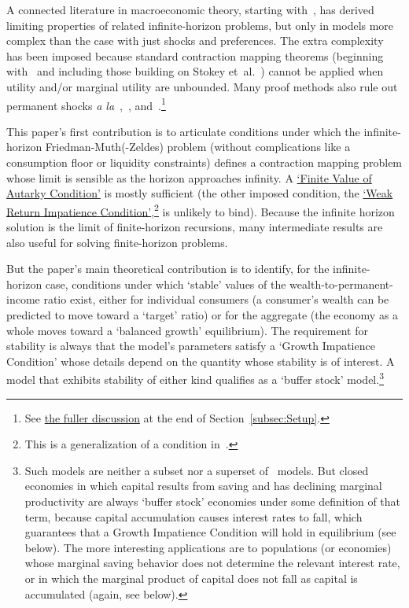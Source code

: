 \documentclass[BufferStockTheory]{subfiles}
\begin{document}
A connected literature in macroeconomic theory, starting with~\cite{bewleyPIH}, has derived limiting properties of related infinite-horizon problems, but only in models more complex than the case with just shocks and preferences. The extra complexity has been imposed because standard contraction mapping theorems (beginning with~\cite{bellmanDynamicProgramming} and including those building on Stokey et~al.~\citeyearpar{slpMethods}) cannot be applied when utility and/or marginal utility are unbounded. Many proof methods also rule out permanent shocks \textit{a la}~\cite{friedmanATheory},~\cite{muthOptimal}, and~\cite{zeldesStochastic}.\footnote{See \hyperlink{DiffFromLit}{the fuller discussion} at the end of Section~\ref{subsec:Setup}.}

This paper's first contribution is to articulate conditions under which the infinite-horizon Friedman-Muth(-Zeldes) problem (without complications like a consumption floor or liquidity constraints) defines a contraction mapping problem whose limit is sensible as the horizon approaches infinity.  A \hyperlink{FVAC}{`Finite Value of Autarky Condition'} is mostly sufficient (the other imposed condition, the \hyperlink{WRIC}{`Weak Return Impatience Condition'},\footnote{This is a generalization of a condition in~\cite{mstIncFluct}.} is unlikely to bind).  Because the infinite horizon solution is the limit of finite-horizon recursions, many intermediate results are also useful for solving finite-horizon problems.

But the paper's main theoretical contribution is to identify, for the infinite-horizon case, conditions under which `stable' values of the wealth-to-permanent-income ratio exist, either for individual consumers (a consumer's wealth can be predicted to move toward a `target' ratio) or for the aggregate (the economy as a whole moves toward a `balanced growth' equilibrium).  The requirement for stability is always that the model's parameters satisfy a `Growth Impatience Condition' whose details depend on the quantity whose stability is of interest.  A model that exhibits stability of either kind qualifies as a `buffer stock' model.\footnote{Such models are neither a subset nor a superset of~\cite{bewleyPIH} models.  But closed economies in which capital results from saving and has declining marginal productivity are always `buffer stock' economies under some definition of that term, because capital accumulation causes interest rates to fall, which guarantees that a Growth Impatience Condition will hold in equilibrium (see below).  The more interesting applications are to populations (or economies) whose marginal saving behavior does not determine the relevant interest rate, or in which the marginal product of capital does not fall as capital is accumulated (again, see below).}
\end{document}
